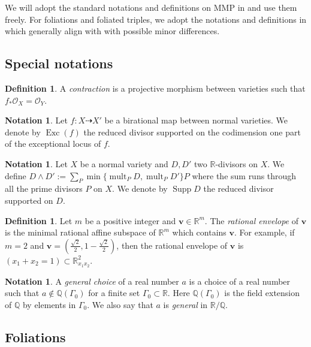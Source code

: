 \documentclass[11pt]{amsart}
\numberwithin{equation}{section}
\newcommand{\Rr}{\mathbb{R}}
\newcommand{\Exc}{\operatorname{Exc}}
\newcommand{\Supp}{\operatorname{Supp}}
\newcommand{\mult}{\operatorname{mult}}
\newcommand{\Ii}{\Gamma}
\theoremstyle{definition}
\newtheorem{defn}[thm]{Definition}
\theoremstyle{definition}
\newtheorem{nota}[thm]{Notation}
\theoremstyle{definition}
\begin{document}
We will adopt the standard notations and definitions on MMP in \cite{KM98,BCHM10} and use them freely. For foliations and foliated triples, we adopt the notations and definitions in \cite{CHLX23} which generally align with \cite{CS20, ACSS21, CS21} with possible minor differences. 

\subsection{Special notations}

\begin{defn}
    A \emph{contraction} is a projective morphism between varieties such that $f_*\mathcal{O}_X=\mathcal{O}_Y$.
\end{defn}


\begin{nota}
    Let $f: X\dashrightarrow X'$ be a birational map between normal varieties. We denote by $\Exc(f)$ the reduced divisor supported on the codimension one part of the exceptional locus of $f$.
\end{nota}

\begin{nota}
    Let $X$ be a normal variety and $D,D'$ two $\Rr$-divisors on $X$. We define 
    $D\wedge D':=\sum_P\min\{\mult_PD,\mult_PD'\}P$ where the sum runs through all the prime divisors $P$ on $X$. We denote by $\Supp D$ the reduced divisor supported on $D$.
\end{nota}



\begin{defn}
Let $m$ be a positive integer and $\bm{v}\in\mathbb R^m$. The \emph{rational envelope} of $\bm{v}$ is the minimal rational affine subspace of $\mathbb R^m$ which contains $\bm{v}$. For example, if $m=2$ and $\bm{v}=\left(\frac{\sqrt{2}}{2},1-\frac{\sqrt{2}}{2}\right)$, then the rational envelope of $\bm{v}$ is $(x_1+x_2=1)\subset\mathbb R^2_{x_1x_2}$.
\end{defn}

\begin{nota}
    A \emph{general choice} of a real number $a$ is a choice of a real number such that $a\not\in\mathbb Q(\Ii_0)$ for a finite set $\Ii_0\subset\mathbb R$. Here $\mathbb Q(\Ii_0)$ is the field extension of $\mathbb Q$ by elements in $\Ii_0$. We also say that $a$ is \emph{general} in $\mathbb R/\mathbb Q$.
\end{nota}

\subsection{Foliations}
\end{document}
